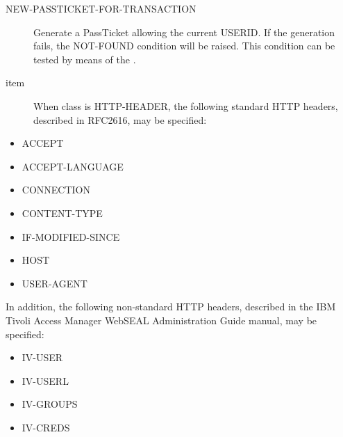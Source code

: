 \documentclass[letterpaper,10pt,english]{sphinxmanual}
\begin{document}
\begin{description}
\item[{NEW-PASSTICKET-FOR-TRANSACTION}] \leavevmode
Generate a PassTicket allowing the current USERID. If the generation fails, the NOT-FOUND condition will be raised. This condition can be tested by means of the {\hyperref[\detokenize{User_Guide:v457ug-if}]{}}.

\item[{item}] \leavevmode
When class is HTTP-HEADER, the following standard HTTP headers, described in RFC2616, may be specified:

\end{description}
\begin{itemize}
\item {} 
ACCEPT

\item {} 
ACCEPT-LANGUAGE

\item {} 
CONNECTION

\item {} 
CONTENT-TYPE

\item {} 
IF-MODIFIED-SINCE

\item {} 
HOST

\item {} 
USER-AGENT

\end{itemize}

In addition, the following non-standard HTTP headers, described in the IBM Tivoli Access Manager WebSEAL Administration Guide manual, may be specified:
\begin{itemize}
\item {} 
IV-USER

\item {} 
IV-USERL

\item {} 
IV-GROUPS

\item {} 
IV-CREDS

\end{itemize}
\end{document}
